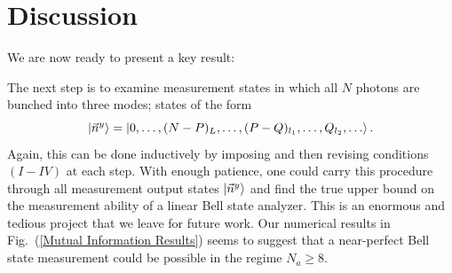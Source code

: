 \documentclass[aps,pra,twocolumn,showpacs,superscriptaddress,floatfix,10pt]{revtex4}
\begin{document}
	\section{Discussion}
We are now ready to present a key result:
\begin{center}
\end{center}
The next step is to examine measurement states in which all $N$ photons are bunched into three modes; states of the form
\begin{equation}
\label{Measurement Outcome Bunched Three Modes}
\small 	\ket{\vec{n}^y} =\ket{0,\dots,(N-P)_L,\dots,(P-Q)_{l_1},\dots,Q_{l_2},\dots}.
\end{equation} 
Again, this can be done inductively by imposing and then revising conditions $(I-IV)$ at each step. With enough patience, one could carry this procedure through all measurement output states $\ket{\vec{n}^y}$ and find the true upper bound on the measurement ability of a linear Bell state analyzer. This is an enormous and tedious project that we leave for future work. Our numerical results in Fig.~(\ref{Mutual Information Results}) seems to suggest that a near-perfect Bell state measurement could be possible in the regime $N_a \ge 8$.
\end{document}
